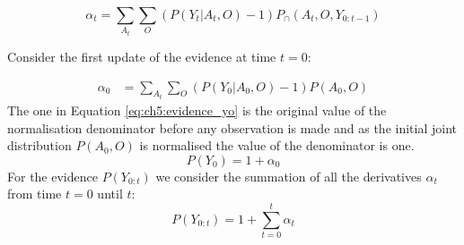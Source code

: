 \begin{equation}
 \alpha_t = \sum\limits_{A_t}\sum\limits_{O} (P(Y_t|A_t,O) - 1)P_{\cap}(A_t,O,Y_{0:t-1})
\end{equation}

Consider the first update of the evidence at time $t=0$:

\begin{align}
 \alpha_0 &= \sum\limits_{A_t}\sum\limits_{O} (P(Y_0|A_0,O) - 1)P(A_0,O) 
\end{align}
The one in Equation \ref{eq:ch5:evidence_yo} is the original value of the normalisation denominator before any observation is made and as the 
initial joint distribution $P(A_0,O)$ is normalised the value of the denominator is one.
\begin{equation}
 P(Y_0) = 1 + \alpha_0 \label{eq:ch5:evidence_yo}
\end{equation}
For the evidence $P(Y_{0:t})$ we consider the summation of all the derivatives $\alpha_t$ from time $t=0$ until $t$:
\begin{equation}
 P(Y_{0:t}) = 1 + \sum_{t=0}^t \alpha_t \label{eq:ch5:evidence_y}
\end{equation}





